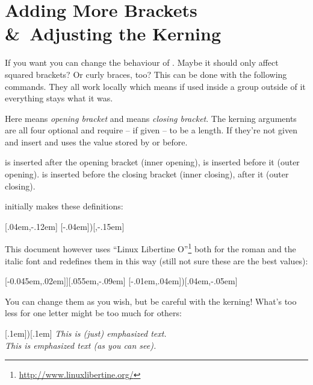 \documentclass[DIV10,toc=index,toc=bib]{cnpkgdoc}
\begin{document}
\section{Adding More Brackets \&\ Adjusting the Kerning}
If you want you can change the behaviour of \embrac. Maybe it should only affect
squared brackets? Or curly braces, too? This can be done with the following
commands. They all work locally which means if used inside a group outside of it
everything stays what it was.
\begin{beschreibung}
\end{beschreibung}
Here  means \emph{opening bracket} and  means \emph{closing
bracket}. The kerning arguments are all four optional and require -- if given --
to be a length. If they're not given  and  insert
\code{0pt} and  uses the value stored by  or
 before.

 is inserted after the opening bracket (inner opening),
 is inserted before it (outer opening).  is
inserted before the closing bracket (inner closing),  after it
(outer closing).

\embrac initially makes these definitions:
\begin{beispiel}
 \AddEmph{[}{]}[.04em,-.12em]
 \AddEmph{(}[-.04em]{)}[,-.15em]
\end{beispiel}

This document however uses ``Linux Libertine O''\footnote{\url{http://www.linuxlibertine.org/}}
both for the roman and the italic font and redefines them in this way (still not
sure these are the best values):
\begin{beispiel}
 \RenewEmph{[}[-0.045em,.02em]{]}[.055em,-.09em]
 \ChangeEmph{(}[-.01em,.04em]{)}[.04em,-.05em]
\end{beispiel}

You can change them as you wish, but be careful with the kerning! What's too less
for one letter might be too much for others:
\begin{beispiel}
 \ChangeEmph{(}[.1em]{)}[.1em]
 \emph{This is (just) emphasized text.} \\ %
 \emph{This is emphasized text (as you can see).} %
\end{beispiel}
\end{document}
